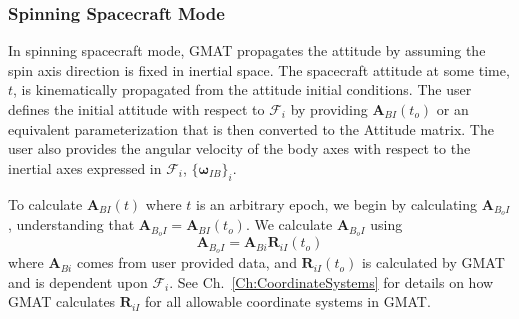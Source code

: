 

\subsubsection{Spinning Spacecraft Mode}

In spinning spacecraft mode, GMAT propagates the attitude by assuming the spin
axis direction is fixed in inertial space.  The spacecraft attitude at some time,
$t$, is kinematically propagated from the attitude initial conditions.
The user defines the initial attitude with respect to $\mathcal{F}_i$ by providing $\mathbf{A}_{BI}(t_o)$ or an equivalent
parameterization that is then converted to the Attitude matrix.  The user also
provides the angular velocity of the body axes with respect to the inertial axes
expressed in $\mathcal{F}_i$, $\{\boldsymbol\omega_{IB}\}_i$.  

To calculate $\mathbf{A}_{BI}(t)$ where $t$ is an arbitrary epoch,
we begin by calculating $\mathbf{A}_{B_{o}I}$, understanding that
$\mathbf{A}_{B_{o}I} = \mathbf{A}_{BI}(t_o)$.  We calculate
$\mathbf{A}_{B_{o}I}$ using
%
\begin{equation}
    \mathbf{A}_{B_{o}I} =  \mathbf{A}_{Bi}\mathbf{R}_{iI}(t_o)
    \label{Eq:ABoI}
\end{equation}
%
where $\mathbf{A}_{Bi}$ comes from user provided data, and
$\mathbf{R}_{iI}(t_o)$ is calculated by GMAT and is dependent upon
$\mathcal{F}_i$.  See Ch.~\ref{Ch:CoordinateSystems} for details on how GMAT
calculates $\mathbf{R}_{iI}$ for all allowable coordinate systems in GMAT.

